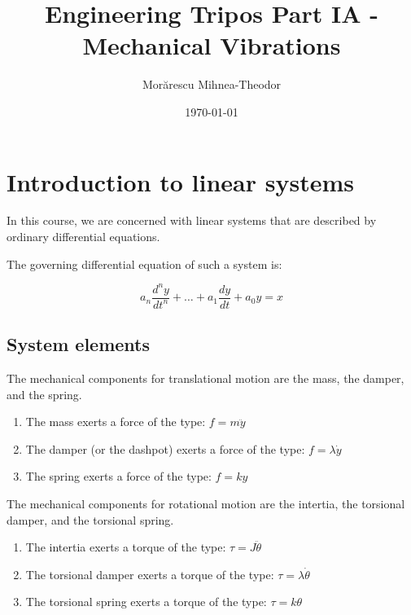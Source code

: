 \documentclass[12pt]{article}
\begin{document}
\title{Engineering Tripos Part IA - Mechanical Vibrations}
\author{Morărescu Mihnea-Theodor}
\date{\today}

\maketitle

\newpage

\tableofcontents

\newpage

\section{Introduction to linear systems}

In this course, we are concerned with linear systems that are described by ordinary differential equations.

\begin{proposition}
  The governing differential equation of such a system is:

  \[ a_n\frac{d^ny}{dt^n} + \ldots + a_1\frac{dy}{dt} + a_0y = x \] 
\end{proposition}

\subsection{System elements}

\begin{proposition}
  The mechanical components for translational motion are the mass, the damper, and the spring.
  \begin{enumerate}
    \item The mass exerts a force of the type: $f = m\ddot{y}$
    \item The damper (or the dashpot) exerts a force of the type: $f = \lambda\dot{y}$
    \item The spring exerts a force of the type: $f = ky$
  \end{enumerate}
\end{proposition}

\begin{proposition}
  The mechanical components for rotational motion are the intertia, the torsional damper, and the torsional spring.
  \begin{enumerate}
    \item The intertia exerts a torque of the type: $\tau = J\ddot{\theta}$
    \item The torsional damper exerts a torque of the type: $\tau = \lambda\dot{\theta}$
    \item The torsional spring exerts a torque of the type: $\tau = k\theta$
  \end{enumerate}
\end{proposition}
\end{document}
